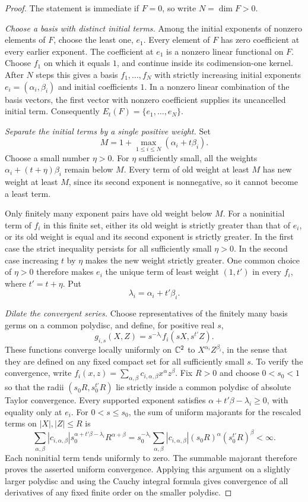 \begin{proof}
The statement is immediate if $F=0$, so write $N=\dim F>0$.

\emph{Choose a basis with distinct initial terms.}
Among the initial exponents of nonzero elements of $F$, choose the
least one, $e_1$.  Every element of $F$ has zero coefficient at every
earlier exponent.  The coefficient at $e_1$ is a nonzero linear
functional on $F$.  Choose $f_1$ on which it equals $1$, and continue
inside its codimension-one kernel.  After $N$ steps this gives a basis
$f_1,\ldots,f_N$ with strictly increasing initial exponents
$e_i=(\alpha_i,\beta_i)$ and initial coefficients $1$.  In a nonzero
linear combination of the basis vectors, the first vector with nonzero
coefficient supplies its uncancelled initial term.  Consequently
$E_t(F)=\{e_1,\ldots,e_N\}$.

\emph{Separate the initial terms by a single positive weight.}
Set
\[
 M=1+\max_{1\le i\le N}(\alpha_i+t\beta_i).
\]
Choose a small number $\eta>0$.  For $\eta$ sufficiently small, all
the weights $\alpha_i+(t+\eta)\beta_i$ remain below $M$.  Every term
of old weight at least $M$ has new weight at least $M$, since its second
exponent is nonnegative, so it cannot become a least term.

Only finitely many exponent pairs have old weight below $M$.  For a
noninitial term of $f_i$ in this finite set, either its old weight is
strictly greater than that of $e_i$, or its old weight is equal and its
second exponent is strictly greater.  In the first case the strict
inequality persists for all sufficiently small $\eta>0$.  In the second
case increasing $t$ by $\eta$ makes the new weight strictly greater.
One common choice of $\eta>0$ therefore makes $e_i$ the unique term of
least weight $(1,t')$ in every $f_i$, where $t'=t+\eta$.  Put
\[
 \lambda_i=\alpha_i+t'\beta_i.
\]

\emph{Dilate the convergent series.}
Choose representatives of the finitely many basis germs on a common
polydisc, and define, for positive real $s$,
\[
 g_{i,s}(X,Z)=s^{-\lambda_i}f_i(sX,s^{t'}Z).
\]
These functions converge locally uniformly on $\mathbb C^2$ to
$X^{\alpha_i}Z^{\beta_i}$, in the sense that they are defined on any
fixed compact set for all sufficiently small $s$.  To verify the
convergence, write
$f_i(x,z)=\sum_{\alpha,\beta}c_{i,\alpha,\beta}x^\alpha z^\beta$.
Fix $R>0$ and choose $0<s_0<1$ so that the radii
$(s_0R,s_0^{t'}R)$ lie strictly inside a common polydisc of absolute
Taylor convergence.  Every supported exponent satisfies
$\alpha+t'\beta-\lambda_i\ge0$, with equality only at $e_i$.
For $0<s\le s_0$, the sum of uniform majorants for the rescaled terms
on $|X|,|Z|\le R$ is
\[
 \sum_{\alpha,\beta}
 |c_{i,\alpha,\beta}|s_0^{\alpha+t'\beta-\lambda_i}R^{\alpha+\beta}
 =s_0^{-\lambda_i}
   \sum_{\alpha,\beta}|c_{i,\alpha,\beta}|
     (s_0R)^\alpha(s_0^{t'}R)^\beta
 <\infty.
\]
Each noninitial term tends uniformly to zero.  The summable majorant
therefore proves the asserted uniform convergence.  Applying this
argument on a slightly larger polydisc and using the Cauchy integral
formula gives convergence of all derivatives of any fixed finite
order on the smaller polydisc.


\end{proof}
